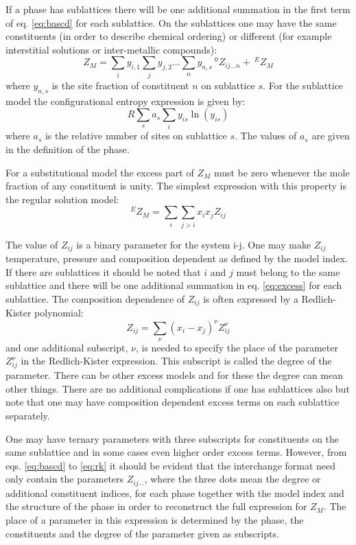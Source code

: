 \documentclass[12pt]{article}
\begin{document}
If a phase has sublattices there will be one additional summation in
the first term of eq.  \ref{eq:bascd} for each sublattice.  On the
sublattices one may have the same constituents (in order to describe
chemical ordering) or different (for example interstitial solutions or
inter-metallic compounds):
\begin{equation}
Z_M = \sum_i y_{i,1} \sum_j y_{j,2} ...  \sum_n y_{n,s} ~^0Z_{ij...n} + ~^EZ_M \label{eq:bassubl}
\end{equation}
where $y_{n,s}$ is the site fraction of constituent $n$ on sublattice
$s$.  For the sublattice model the configurational entropy expression
is given by:
\begin{equation}
R\sum_s a_s \sum_i y_{is} \ln(y_{is})
\end{equation}
where $a_s$ is the relative number of sites on sublattice $s$.   The
values of $a_s$ are given in the definition of the phase.

For a substitutional model the excess part of $Z_M$ must be zero
whenever the mole fraction of any constituent is unity.  The simplest
expression with this property is the regular solution model:
\begin{equation}
^EZ_M = \sum_i \sum_{j>i} x_i x_j Z_{ij} \label{eq:excess}
\end{equation}

The value of $Z_{ij}$ is a binary parameter for the system i-j.  One
may make $Z_{ij}$ temperature, pressure and composition dependent as
defined by the model index.  If there are sublattices it should be
noted that $i$ and $j$ must belong to the same sublattice and there
will be one additional summation in eq.  \ref{eq:excess} for each
sublattice.  The composition dependence of $Z_{ij}$ is often expressed
by a Redlich-Kister polynomial:
\begin{equation}
Z_{ij} = \sum_{\nu} (x_i - x_j)^{\nu} Z_{ij}^{\nu} \label{eq:rk}
\end{equation}
and one additional subscript, $\nu$, is needed to specify the place of
the parameter $Z_{ij}^{\nu}$ in the Redlich-Kister expression.  This
subscript is called the degree of the parameter.  There can be other
excess models and for these the degree can mean other things.  There
are no additional complications if one has sublattices also but note
that one may have composition dependent excess terms on each
sublattice separately.

One may have ternary parameters with three subscripts for constituents
on the same sublattice and in some cases even higher order excess
terms.  However, from eqs.  \ref{eq:bascd} to \ref{eq:rk} it should be
evident that the interchange format need only contain the parameters
$Z_{ij...}$, where the three dots mean the degree or additional
constituent indices, for each phase together with the model index and
the structure of the phase in order to reconstruct the full expression
for $Z_M$.  The place of a parameter in this expression is determined
by the phase, the constituents and the degree of the parameter given
as subscripts.
\end{document}
